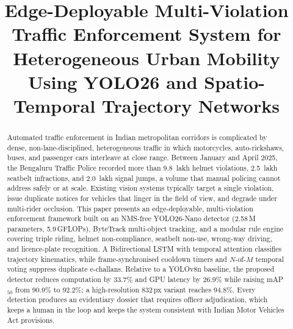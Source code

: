 \documentclass[conference]{IEEEtran}
\begin{document}
\title{Edge-Deployable Multi-Violation Traffic Enforcement System for Heterogeneous Urban Mobility Using YOLO26 and Spatio-Temporal Trajectory Networks}

\author{
}

\maketitle

\begin{abstract}
Automated traffic enforcement in Indian metropolitan corridors is complicated by dense, non-lane-disciplined, heterogeneous traffic in which motorcycles, auto-rickshaws, buses, and passenger cars interleave at close range. Between January and April 2025, the Bengaluru Traffic Police recorded more than 9.8~lakh helmet violations, 2.5~lakh seatbelt infractions, and 2.0~lakh signal jumps, a volume that manual policing cannot address safely or at scale. Existing vision systems typically target a single violation, issue duplicate notices for vehicles that linger in the field of view, and degrade under multi-rider occlusion. This paper presents an edge-deployable, multi-violation enforcement framework built on an NMS-free YOLO26-Nano detector (2.58\,M parameters, 5.9\,GFLOPs), ByteTrack multi-object tracking, and a modular rule engine covering triple riding, helmet non-compliance, seatbelt non-use, wrong-way driving, and licence-plate recognition. A Bidirectional LSTM with temporal attention classifies trajectory kinematics, while frame-synchronised cooldown timers and $N$-of-$M$ temporal voting suppress duplicate e-challans. Relative to a YOLOv8n baseline, the proposed detector reduces computation by 33.7\% and GPU latency by 26.9\% while raising mAP$_{50}$ from 90.9\% to 92.2\%; a high-resolution 832\,px variant reaches 94.8\%. Every detection produces an evidentiary dossier that requires officer adjudication, which keeps a human in the loop and keeps the system consistent with Indian Motor Vehicles Act provisions.
\end{abstract}
\end{document}

